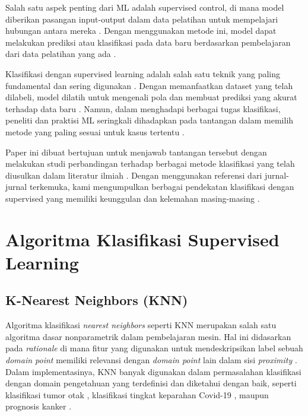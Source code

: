 \documentclass[conference]{IEEEtran}
\begin{document}
Salah satu aspek penting dari ML adalah supervised control, di mana model diberikan pasangan input-output dalam data pelatihan untuk mempelajari 
hubungan antara mereka \cite{b1}. Dengan menggunakan metode ini, model dapat melakukan prediksi atau klasifikasi pada data baru berdasarkan 
pembelajaran dari data pelatihan yang ada \cite{b1}.

Klasifikasi dengan supervised learning adalah salah satu teknik yang paling fundamental dan sering digunakan \cite{b1}. Dengan memanfaatkan dataset yang telah dilabeli, 
model dilatih untuk mengenali pola dan membuat prediksi yang akurat terhadap data baru \cite{b2}. Namun, dalam menghadapi berbagai tugas klasifikasi, peneliti dan praktisi ML 
seringkali dihadapkan pada tantangan dalam memilih metode yang paling sesuai untuk kasus tertentu \cite{b1}.

Paper ini dibuat bertujuan untuk menjawab tantangan tersebut dengan melakukan studi perbandingan terhadap berbagai metode klasifikasi yang telah diusulkan dalam literatur ilmiah \cite{b3}. 
Dengan menggunakan referensi dari jurnal-jurnal terkemuka, kami mengumpulkan berbagai pendekatan klasifikasi dengan supervised yang memiliki keunggulan dan kelemahan masing-masing \cite{b3}.

\section{Algoritma Klasifikasi Supervised Learning}

\subsection{K-Nearest Neighbors (KNN)}

Algoritma klasifikasi \textit{nearest neighbors} seperti KNN merupakan salah satu algoritma dasar nonparametrik 
dalam pembelajaran mesin. Hal ini didasarkan pada \textit{rationale} di mana fitur yang digunakan untuk 
mendeskripsikan label sebuah \textit{domain point} memiliki relevansi dengan \textit{domain point} lain dalam sisi 
\textit{proximity} \cite{b4, b5}. Dalam implementasinya, KNN banyak digunakan dalam permasalahan 
klasifikasi dengan domain pengetahuan yang terdefinisi dan diketahui dengan baik, 
seperti klasifikasi tumor otak \cite{b6}, klasifikasi tingkat keparahan Covid-19 \cite{b7}, maupun prognosis kanker \cite{b8}.
\end{document}

